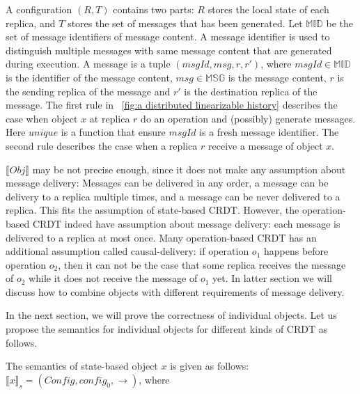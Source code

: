 A configuration $(R,T)$ contains two parts: $R$ stores the local state of each replica, and $T$ stores the set of messages that has been generated. Let $\mathbb{MID}$ be the set of message identifiers of message content. A message identifier is used to distinguish multiple messages with same message content that are generated during execution. A message is a tuple $(\mathit{msgId},\mathit{msg},r,r')$, where $\mathit{msgId} \in \mathbb{MID}$ is the identifier of the message content, $\mathit{msg} \in \mathbb{MSG}$ is the message content, $r$ is the sending replica of the message and $r'$ is the destination replica of the message. The first rule in \figurename~\ref{fig:a distributed linearizable history} describes the case when object $x$ at replica $r$ do an operation and (possibly) generate messages. Here $\mathit{unique}$ is a function that ensure $\mathit{msgId}$ is a fresh message identifier. The second rule describes the case when a replica $r$ receive a message of object $x$.

$\llbracket \mathit{Obj} \rrbracket$ may be not precise enough, since it does not make any assumption about message delivery: Messages can be delivered in any order, a message can be delivery to a replica multiple times, and a message can be never delivered to a replica. This fits the assumption of state-based CRDT. However, the operation-based CRDT indeed have assumption about message delivery: each message is delivered to a replica at most once. Many operation-based CRDT has an additional assumption called causal-delivery: if operation $o_1$ happens before operation $o_2$, then it can not be the case that some replica receives the message of $o_2$ while it does not receive the message of $o_1$ yet. In latter section we will discuss how to combine objects with different requirements of message delivery.

In the next section, we will prove the correctness of individual objects. Let us propose the semantics for individual objects for different kinds of CRDT as follows.

The semantics of state-based object $x$ is given as follows: $\llbracket x \rrbracket_{s} = (\mathit{Config},\mathit{config}_0,\rightarrow)$, where

